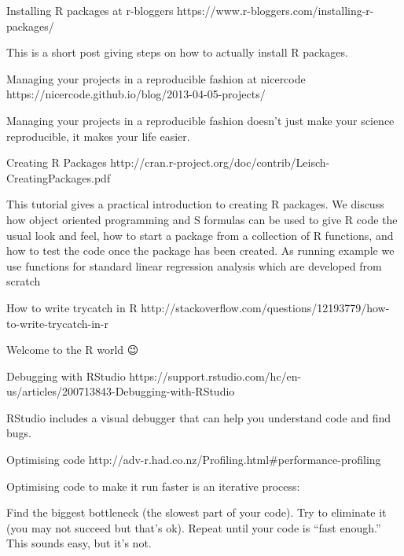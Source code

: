 Installing R packages at r-bloggers
https://www.r-bloggers.com/installing-r-packages/

This is a short post giving steps on how to actually install R packages.

Managing your projects in a reproducible fashion at nicercode
https://nicercode.github.io/blog/2013-04-05-projects/

Managing your projects in a reproducible fashion doesn’t just make your science reproducible, it makes your life easier.

Creating R Packages
http://cran.r-project.org/doc/contrib/Leisch-CreatingPackages.pdf

This tutorial gives a practical introduction to creating R packages. We discuss how object oriented programming and S formulas can be used to give R code the usual look and feel, how to start a package from a collection of R functions, and how to test the code once the package has been created. As running example we use functions for standard linear regression analysis which are developed from scratch

How to write trycatch in R
http://stackoverflow.com/questions/12193779/how-to-write-trycatch-in-r

Welcome to the R world 😉

Debugging with RStudio
https://support.rstudio.com/hc/en-us/articles/200713843-Debugging-with-RStudio

RStudio includes a visual debugger that can help you understand code and find bugs.

Optimising code
http://adv-r.had.co.nz/Profiling.html#performance-profiling

Optimising code to make it run faster is an iterative process:

Find the biggest bottleneck (the slowest part of your code). Try to eliminate it (you may not succeed but that’s ok). Repeat until your code is “fast enough.” This sounds easy, but it’s not.